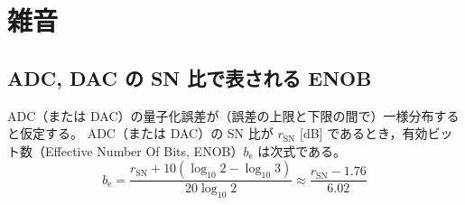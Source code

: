 \part{雑音}
    \newcommand{\rSN}{r_\text{SN}}
    \newcommand{\bEff}{b_\text{e}}
    \newcommand{\Afl}{A_\text{full}}
    \newcommand{\An}{A_\text{n}}
    \newcommand{\Psig}{P_\text{sig}}
    \newcommand{\Pn}{P_\text{n}}
    \chapter{ADC, DAC の SN 比で表される ENOB}
        \begin{shadebox}
            ADC（または DAC）の量子化誤差が（誤差の上限と下限の間で）一様分布すると仮定する。
            ADC（または DAC）の SN 比が $\rSN$ [dB] であるとき，有効ビット数（Effective Number Of Bits, ENOB）$\bEff$ は次式である。
            \[ \bEff = \frac{\rSN + 10(\log_{10} 2 - \log_{10} 3)}{20\log_{10} 2} \approx \frac{\rSN - 1.76}{6.02} \]
        \end{shadebox}
